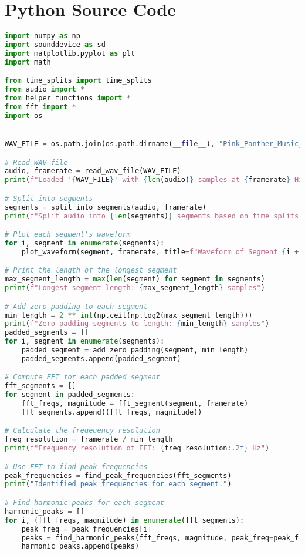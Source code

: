 \chapter{Python Source Code}

\begin{lstlisting}[language=Python, caption={main.py}, label={lst:main}]
import numpy as np
import sounddevice as sd
import matplotlib.pyplot as plt
import math

from time_splits import time_splits
from audio import *
from helper_functions import *
from fft import *
import os


WAV_FILE = os.path.join(os.path.dirname(__file__), "Pink_Panther_Music_Box.wav")

# Read WAV file
audio, framerate = read_wav_file(WAV_FILE)
print(f"Loaded '{WAV_FILE}' with {len(audio)} samples at {framerate} Hz")

# Split into segments
segments = split_into_segments(audio, framerate)
print(f"Split audio into {len(segments)} segments based on time_splits.")

# Plot each segment's waveform
for i, segment in enumerate(segments):
    plot_waveform(segment, framerate, title=f"Waveform of Segment {i + 1}", index=i + 1)

# Print the length of the longest segment
max_segment_length = max(len(segment) for segment in segments)
print(f"Longest segment length: {max_segment_length} samples")

# Add zero-padding to each segment
min_length = 2 ** int(np.ceil(np.log2(max_segment_length)))
print(f"Zero-padding segments to length: {min_length} samples")
padded_segments = []
for i, segment in enumerate(segments):
    padded_segment = add_zero_padding(segment, min_length)
    padded_segments.append(padded_segment)

# Compute FFT for each padded segment
fft_segments = []
for segment in padded_segments:
    fft_freqs, magnitude = fft_segment(segment, framerate)
    fft_segments.append((fft_freqs, magnitude))

# Calculate the freqeuency resolution
freq_resolution = framerate / min_length
print(f"Frequency resolution of FFT: {freq_resolution:.2f} Hz")

# Use FFT to find peak frequencies
peak_frequencies = find_peak_frequencies(fft_segments)
print("Identified peak frequencies for each segment.")

# Find harmonic peaks for each segment
harmonic_peaks = []
for i, (fft_freqs, magnitude) in enumerate(fft_segments):
    peak_freq = peak_frequencies[i]
    peaks = find_harmonic_peaks(fft_freqs, magnitude, peak_freq=peak_freq)
    harmonic_peaks.append(peaks)


\end{lstlisting}
